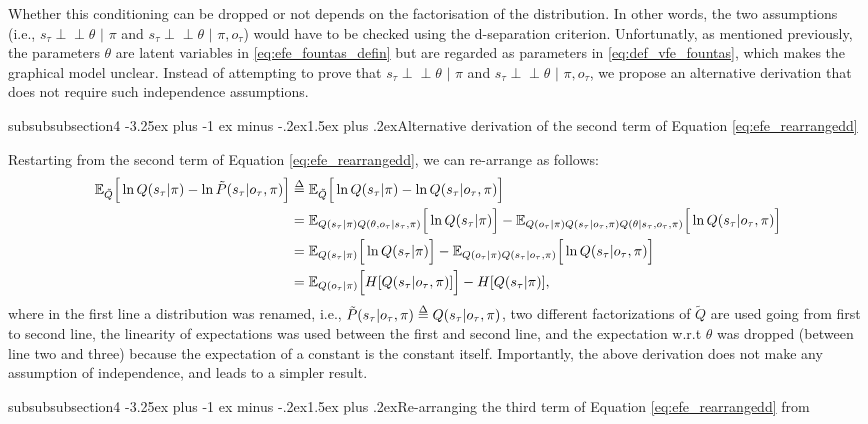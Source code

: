 \documentclass[twoside,11pt]{article}
\makeatletter
\def\delequal{\mathrel{\ensurestackMath{\stackon[1pt]{=}{\scriptstyle\Delta}}}}
\newcommand{\indep}{\perp \! \! \! \perp}
\newcounter{subsubsubsection}[subsubsection]
\def\subsubsubsection{\@startsection
     {subsubsubsection}{4}{\z@} {-3.25ex plus -1
     ex minus -.2ex}{1.5ex plus .2ex}{\normalsize\bf}}
\makeatother
\begin{document}
Whether this conditioning can be dropped or not depends on the factorisation of the distribution. In other words, the two assumptions (i.e., $s_\tau \indep \theta \,\,|\,\, \pi$ and $s_\tau \indep \theta \,\,| \,\,\pi, o_\tau$) would have to be checked using the d-separation criterion. Unfortunatly, as mentioned previously, the parameters $\theta$ are latent variables in \eqref{eq:efe_fountas_defin} but are regarded as parameters in \eqref{eq:def_vfe_fountas}, which makes the graphical model unclear. Instead of attempting to prove that $s_\tau \indep \theta \,\,|\,\, \pi$ and $s_\tau \indep \theta \,\,| \,\,\pi, o_\tau$, we propose an alternative derivation that does not require such independence assumptions.

\subsubsubsection{Alternative derivation of the second term of Equation  \eqref{eq:efe_rearrangedd}}

Restarting from the second term of Equation \eqref{eq:efe_rearrangedd}, we can  re-arrange as follows:
\begin{align*}
\mathbb{E}_{\tilde{Q}}\Big[ \ln Q(s_\tau|\pi) - \ln \tilde{P}(s_\tau|o_\tau, \pi) \Big] &\delequal \mathbb{E}_{\tilde{Q}}\Big[ \ln Q(s_\tau|\pi) - \ln Q(s_\tau|o_\tau, \pi) \Big]\\
&= \mathbb{E}_{Q(s_\tau|\pi)Q(\theta,o_\tau|s_\tau,\pi)}\Big[ \ln Q(s_\tau|\pi)\Big] - \mathbb{E}_{Q(o_\tau|\pi)Q(s_\tau|o_\tau,\pi)Q(\theta|s_\tau,o_\tau,\pi)}\Big[ \ln Q(s_\tau|o_\tau, \pi) \Big]\\
&= \mathbb{E}_{Q(s_\tau|\pi)}\Big[ \ln Q(s_\tau|\pi)\Big] - \mathbb{E}_{Q(o_\tau|\pi)Q(s_\tau|o_\tau,\pi)}\Big[ \ln Q(s_\tau|o_\tau, \pi) \Big]\\
&= \mathbb{E}_{Q(o_\tau|\pi)}\Big[ H[Q(s_\tau|o_\tau, \pi)] \Big] - H[Q(s_\tau|\pi)],
\end{align*}
where in the first line a distribution was renamed, i.e., $\tilde{P}(s_\tau|o_\tau, \pi) \delequal Q(s_\tau|o_\tau, \pi)$, two different factorizations of $\tilde{Q}$ are used going from first to second line, the linearity of expectations was used between the first and second line, and the expectation w.r.t $\theta$ was dropped (between line two and three) because the expectation of a constant is the constant itself. Importantly, the above derivation does not make any assumption of independence, and leads to a simpler result.

\subsubsubsection{Re-arranging the third term of Equation \eqref{eq:efe_rearrangedd} from \citet{DeepAIwithMCMC}}
\end{document}
